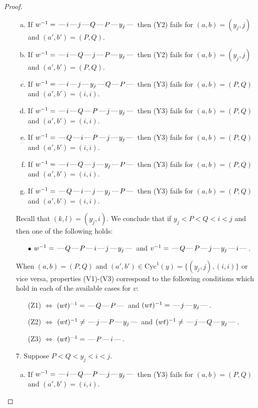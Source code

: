 \documentclass[10pt]{article}
\theoremstyle{definition}
\theoremstyle{definition}
\def\dash{\text{\hspace{0.5mm}---\hspace{0.5mm}}}
\def\Cyc{\mathrm{Cyc}}
\begin{document}
\begin{proof}
\begin{enumerate}
\begin{enumerate}[(a)]
\item If $w^{-1} = \dash i\dash j\dash Q\dash P\dash y_j\dash $ then (Y2) fails for $(a,b)=(y_j,j)$ and $(a',b')=(P,Q)$.
\item If $w^{-1} = \dash i\dash Q\dash j\dash P\dash y_j\dash $ then (Y2) fails for $(a,b)=(y_j,j)$ and $(a',b')=(P,Q)$.
\item If $w^{-1} = \dash i\dash j\dash y_j\dash Q\dash P\dash $ then (Y3) fails for $(a,b)=(P,Q)$ and $(a',b')=(i,i)$.
\item If $w^{-1} = \dash i\dash Q\dash P\dash j\dash y_j\dash $ then (Y3) fails for $(a,b)=(P,Q)$ and $(a',b')=(i,i)$.
\item If $w^{-1} = \dash Q\dash i\dash P\dash j\dash y_j\dash $ then (Y3) fails for $(a,b)=(P,Q)$ and $(a',b')=(i,i)$.
\item If $w^{-1} = \dash i\dash Q\dash j\dash y_j\dash P\dash $ then (Y3) fails for $(a,b)=(P,Q)$ and $(a',b')=(i,i)$.
\item If $w^{-1} = \dash Q\dash i\dash j\dash y_j\dash P\dash $ then (Y3) fails for $(a,b)=(P,Q)$ and $(a',b')=(i,i)$.
\end{enumerate}
Recall that $(k,l) = (y_j,i)$.
We conclude that if $y_j < P < Q < i < j$ and then one of the following holds:
\begin{enumerate}
\item[$\bullet$] $w^{-1} = \dash Q\dash P\dash i\dash j\dash y_j\dash $ and $v^{-1} = \dash Q\dash P\dash j\dash y_j\dash i\dash $.
\end{enumerate}
When $(a,b)= (P,Q)$ and $(a',b')\in \Cyc^1(y)=\{(y_j,j),(i,i)\}$ or vice versa,
properties (V1)-(V3) correspond to the following conditions which hold in
each of the available cases for $v$:
\begin{enumerate}
\item[](Z1) $\Leftrightarrow$ $(wt)^{-1} = \dash Q \dash P \dash$  and $(wt)^{-1} = \dash j \dash y_j \dash$.
\item[](Z2) $\Leftrightarrow$ $(wt)^{-1} \neq \dash j \dash P \dash y_j \dash$ and $(wt)^{-1}\neq \dash j \dash Q \dash y_j \dash$.
\item[](Z3) $\Leftrightarrow$ $(wt)^{-1} = \dash P \dash i \dash$.
\end{enumerate}
\item[$7$.] Suppose $P < Q < y_j < i < j$.
\begin{enumerate}[(a)]
\item If $w^{-1} = \dash i\dash Q\dash P\dash j\dash y_j\dash $ then (Y3) fails for $(a,b)=(P,Q)$ and $(a',b')=(i,i)$.

\end{enumerate}
\end{enumerate}
\end{proof}
\end{document}

